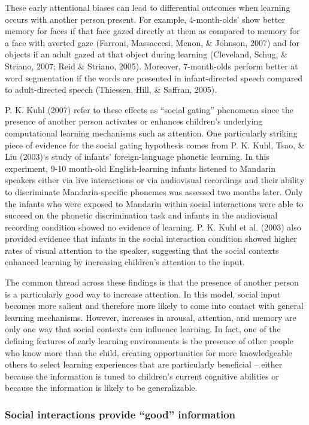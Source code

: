 \documentclass[a4paper,man,apacite,floatsintext]{apa6}
\begin{document}
These early attentional biases can lead to differential outcomes when
learning occurs with another person present. For example, 4-month-olds'
show better memory for faces if that face gazed directly at them as
compared to memory for a face with averted gaze (Farroni, Massaccesi,
Menon, \& Johnson, 2007) and for objects if an adult gazed at that
object during learning (Cleveland, Schug, \& Striano, 2007; Reid \&
Striano, 2005). Moreover, 7-month-olds perform better at word
segmentation if the words are presented in infant-directed speech
compared to adult-directed speech (Thiessen, Hill, \& Saffran, 2005).

P. K. Kuhl (2007) refer to these effects as ``social gating'' phenomena
since the presence of another person activates or enhances children's
underlying computational learning mechanisms such as attention. One
particularly striking piece of evidence for the social gating hypothesis
comes from P. K. Kuhl, Tsao, \& Liu (2003)`s study of infants'
foreign-language phonetic learning. In this experiment, 9-10 month-old
English-learning infants listened to Mandarin speakers either via live
interactions or via audiovisual recordings and their ability to
discriminate Mandarin-specific phonemes was assessed two months later.
Only the infants who were exposed to Mandarin within social interactions
were able to succeed on the phonetic discrimination task and infants in
the audiovisual recording condition showed no evidence of learning. P.
K. Kuhl et al. (2003) also provided evidence that infants in the social
interaction condition showed higher rates of visual attention to the
speaker, suggesting that the social contexts enhanced learning by
increasing children's attention to the input.

The common thread across these findings is that the presence of another
person is a particularly good way to increase attention. In this model,
social input becomes more salient and therefore more likely to come into
contact with general learning mechanisms. However, increases in arousal,
attention, and memory are only one way that social contexts can
influence learning. In fact, one of the defining features of early
learning environments is the presence of other people who know more than
the child, creating opportunities for more knowledgeable others to
select learning experiences that are particularly beneficial -- either
because the information is tuned to children's current cognitive
abilities or because the information is likely to be generalizable.

\subsubsection{\texorpdfstring{Social interactions provide ``good''
information}{Social interactions provide good information}}\label{social-interactions-provide-good-information}
\end{document}
